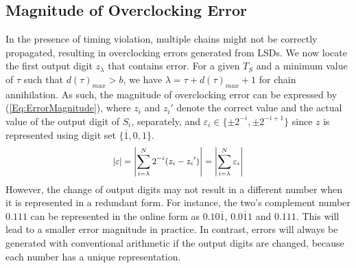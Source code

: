 \documentclass{acm_proc_article-sp}
\begin{document}
\subsection{Magnitude of Overclocking Error}
In the presence of timing violation, multiple chains might not be correctly propagated, resulting in overclocking errors generated from LSDs. We now locate the first output digit $z_{\lambda}$ that contains error. For a given $T_S$ and a minimum value of $\tau$ such that $d(\tau)_{max}>b$, we have $\lambda=\tau+d(\tau)_{max}+1$ for chain annihilation.
%
%
As such, the magnitude of overclocking error can be expressed by (\ref{Eq:ErrorMagnitude}), where $z_i$ and ${z_i}'$ denote the correct value and the actual value of the output digit of $S_i$, separately, and $\varepsilon_i\in\{\pm2^{-i},\pm2^{-i+1}\}$ since $z$ is represented using digit set $\{\overline{1},0,1\}$.
%
\begin{eqnarray}\label{Eq:ErrorMagnitude}
\scriptsize
  \left|\varepsilon\right|=\left|\sum_{i=\lambda}^{N}2^{-i}(z_i-{z_i}')\right|=\left|\sum_{i=\lambda}^{N} \varepsilon_i\right|
\normalsize
\end{eqnarray}
%
However, the change of output digits may not result in a different number when it is represented in a redundant form. For instance, the two's complement number $0.111$ can be represented in the online form as $0.10\overline{1}$, $0.0\overline{1}1$ and $0.111$. This will lead to a smaller error magnitude in practice. In contrast, errors will always be generated with conventional arithmetic if the output digits are changed, because each number has a unique representation.\vspace{-1ex} 



\end{document}
